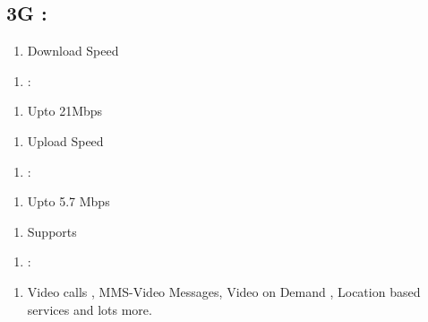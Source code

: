 \documentclass{article}
\newcommand\tab[1][1cm]{\hspace*{#1}}
\begin{document}
\subsection{3G :}
\begin{multicols}{3}
\begin{enumerate}[label= ]
\item \tab Download Speed
\end{enumerate}
\columnbreak
\begin{enumerate}[label= ]
\item :
\end{enumerate}
\columnbreak
\begin{enumerate}[label= ]
\item Upto 21Mbps
\end{enumerate}
\end{multicols}
\begin{multicols}{3}
\begin{enumerate}[label= ]
\item \tab Upload Speed
\end{enumerate}
\columnbreak
\begin{enumerate}[label= ]
\item :
\end{enumerate}
\columnbreak
\begin{enumerate}[label= ]
\item Upto 5.7 Mbps
\end{enumerate}
\end{multicols}
\begin{multicols}{3}
\begin{enumerate}[label= ]
\item \tab Supports
\end{enumerate}
\columnbreak
\begin{enumerate}[label= ]
\item :
\end{enumerate}
\columnbreak
\begin{enumerate}[label= ]
\item Video calls , MMS-Video Messages, Video on Demand , Location based services and lots more.
\end{enumerate}
\end{multicols}
\vspace{0.02\textheight}
\end{document}
